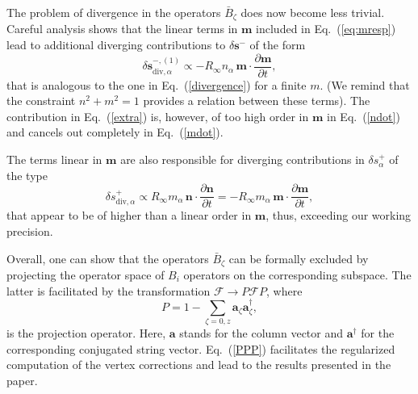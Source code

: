 \documentclass[%
  twocolumn,
  aps,
  prb,
  amsmath,
  amssymb,
  superscriptaddress,
  nofootinbib,
  floatfix
]{revtex4-1}
\newcommand{\s}{\sum\limits}
\newcommand{\pa}{\partial}
\newcommand{\be}{\begin{equation}}
\newcommand{\e}{\end{equation}}
\newcommand{\bb}{\boldsymbol}
\newcommand{\h}{^\dagger}
\newcommand{\0}{^{\phantom{\dagger}}}
\begin{document}
The problem of divergence in the operators $\bar{B}_\zeta$ does now become less trivial. Careful analysis shows that the linear terms in $\bb{m}$ included in Eq.~(\ref{eq:mresp}) lead to additional diverging contributions to $\delta\bb{s}^{-}$ of the form
\be
\label{extra}
\delta\bb{s}^{-, (1)}_{\text{div},\alpha} \propto  - R_\infty n_\alpha\, \bb{m}\cdot\frac{\pa \bb{m}}{\pa t},
\e
that is analogous to the one in Eq.~(\ref{divergence}) for a finite $m$. (We remind that the constraint $n^2+m^2=1$ provides a relation between these terms). The contribution in Eq.~(\ref{extra}) is, however, of too high order in $\bb{m}$ in Eq.~(\ref{ndot}) and cancels out completely in Eq.~(\ref{mdot}).

The terms linear in $\bb{m}$ are also responsible for diverging contributions in $\delta s_\alpha^{+}$ of the type 
\be
\delta s^{+}_{\text{div},\alpha} \propto R_\infty m_\alpha\, \bb{n}\cdot\frac{\pa \bb{n}}{\pa t}= - R_\infty m_\alpha\, \bb{m}\cdot\frac{\pa \bb{m}}{\pa t},
\e
that appear to be of higher than a linear order in $\bb{m}$, thus, exceeding our working precision.

Overall, one can show that the operators $\bar{B}_\zeta$ can be formally excluded by projecting the operator space of $B_i$ operators on the corresponding subspace. The latter is facilitated by the transformation $\mathcal{F}\to P\mathcal{F}P$, where 
\be
\label{PPP}
P= 1- \s_{\zeta=0,z}\bb{a}_\zeta \bb{a}\h_\zeta, 
\e
is the projection operator. Here, $\bb{a}$ stands for the column vector and $\bb{a}\h$ for the corresponding conjugated string vector. Eq.~(\ref{PPP}) facilitates the regularized computation of the vertex corrections and lead to the results presented in the paper.



\end{document}
